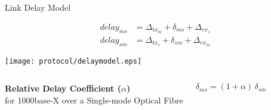 \documentclass[compress,red]{beamer}
\begin{document}
\subsection{}
\begin{frame}{Link Delay Model}

  \begin{align}
    \nonumber delay_{ms} &= \Delta_{tx_m} + \delta_{ms} + \Delta_{rx_s} \\
    \nonumber delay_{sm} &= \Delta_{tx_s} + \delta_{sm} + \Delta_{rx_m}
  \end{align}

   \vspace{0.2cm}

  \begin{center}
  \texttt{[image: protocol/delaymodel.eps]}
  \end{center}

\begin{columns}[c]
  \column{2.8in}

    \begin{center}
      \textbf{Relative Delay Coefficient ($\alpha$)} \\
      for 1000base-X over a Single-mode Optical Fibre
    \end{center}

  \column{1.5in}
    \begin{center}
      \begin{equation}
      \nonumber \delta_{ms} = (1 + \alpha) \, \delta_{sm}
      \end{equation}
    \end{center}
    \vspace{0.5cm}
\end{columns}
  

\end{frame}
\end{document}

